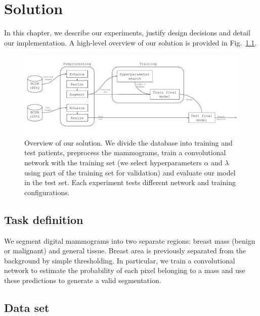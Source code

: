 \chapter{Solution}
\label{ch:Model}

In this chapter, we describe our experiments, justify design decisions and detail our implementation. A high-level overview of our solution is provided in Fig.~\ref{fig:overview}. 
\begin{figure}[ht]
	\centering
	\includegraphics[width=\textwidth]{plots/overview.pdf}
	\caption[Overview of the solution]{Overview of our solution. We divide the database into training and test patients, preprocess the mammograms, train a convolutional network with the training set (we select hyperparameters $\alpha$ and $\lambda$ using part of the training set for validation) and evaluate our model in the test set. Each experiment tests different network and training configurations.}
	\label{fig:overview}
\end{figure}

\section{Task definition}
We segment digital mammograms into two separate regions: breast mass (benign or malignant) and general tissue.
Breast area is previously separated from the background by simple thresholding.
In particular, we train a convolutional network to estimate the probability of each pixel belonging to a mass and use these predictions to generate a valid segmentation.

\section{Data set}


